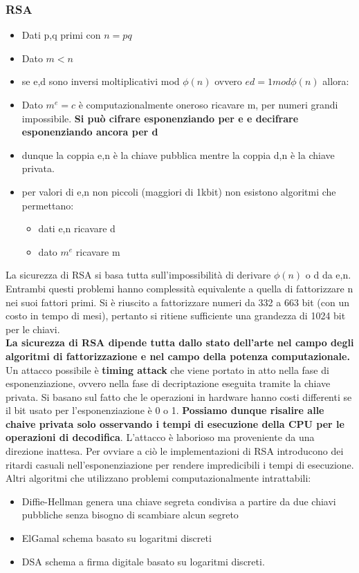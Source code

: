 \documentclass[12pt]{article}
\begin{document}
			\subsubsection{RSA}
			\begin{itemize}
				\item Dati p,q primi con $n = pq$
				\item Dato $m<n$
				\item se e,d sono inversi moltiplicativi mod $\phi(n)$ ovvero $ed = 1mod\phi(n)$ allora:
			\end{itemize}
		
			
			
			
			\begin{itemize}
				\item Dato $m^{e}=c$ è computazionalmente oneroso ricavare m, per numeri grandi impossibile. \textbf{Si può cifrare esponenziando per e e decifrare esponenziando ancora per d}
				\item dunque la coppia e,n è la chiave pubblica mentre la coppia d,n è la chiave privata.
				\item per valori di e,n non piccoli (maggiori di 1kbit) non esistono algoritmi che permettano:
				\begin{itemize}
					\item dati e,n ricavare d
					\item dato $m^{e} $ ricavare m
				\end{itemize}
			\end{itemize}	
		
			La sicurezza di RSA si basa tutta sull'impossibilità di derivare $\phi(n)$ o d da e,n. Entrambi questi problemi hanno complessità equivalente a quella di fattorizzare n nei suoi fattori primi. Si è riuscito a fattorizzare numeri da 332 a 663 bit (con un costo in tempo di mesi), pertanto si ritiene sufficiente una grandezza di 1024 bit per le chiavi. \\
			\textbf{La sicurezza di RSA dipende tutta dallo stato dell'arte nel campo degli algoritmi di fattorizzazione e nel campo della potenza computazionale.}\\
			Un attacco possibile è \textbf{timing attack} che viene portato in atto nella fase di esponenziazione, ovvero nella fase di decriptazione eseguita tramite la chiave privata. Si basano sul fatto che le operazioni in hardware hanno costi differenti se il bit usato per l'esponenziazione è 0 o 1. \textbf{Possiamo dunque risalire alle chaive privata solo osservando i tempi di esecuzione della CPU per le operazioni di decodifica}. L'attacco è laborioso ma proveniente da una direzione inattesa. Per ovviare a ciò le implementazioni di RSA introducono dei ritardi casuali nell'esponenziazione per rendere impredicibili i tempi di esecuzione.
			Altri algoritmi che utilizzano problemi computazionalmente intrattabili:
			\begin{itemize}
				\item Diffie-Hellman genera una chiave segreta condivisa a partire da due chiavi pubbliche senza bisogno di scambiare alcun segreto
				\item ElGamal schema basato su logaritmi discreti
				\item DSA schema a firma digitale basato su logaritmi discreti.
			\end{itemize}
\end{document}
